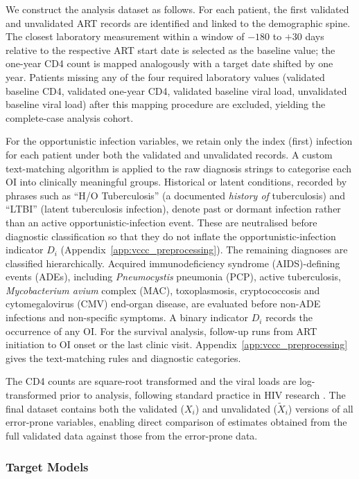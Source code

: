 We construct the analysis dataset as follows. For each patient, the first validated and unvalidated ART records are identified and linked to the demographic spine. The closest laboratory measurement within a window of $-180$ to $+30$ days relative to the respective ART start date is selected as the baseline value; the one-year CD4 count is mapped analogously with a target date shifted by one year. Patients missing any of the four required laboratory values (validated baseline CD4, validated one-year CD4, validated baseline viral load, unvalidated baseline viral load) after this mapping procedure are excluded, yielding the complete-case analysis cohort.

For the opportunistic infection variables, we retain only the index (first) infection for each patient under both the validated and unvalidated records. A custom text-matching algorithm is applied to the raw diagnosis strings to categorise each OI into clinically meaningful groups. Historical or latent conditions, recorded by phrases such as ``H/O Tuberculosis'' (a documented \emph{history of} tuberculosis) and ``LTBI'' (latent tuberculosis infection), denote past or dormant infection rather than an active opportunistic-infection event. These are neutralised before diagnostic classification so that they do not inflate the opportunistic-infection indicator $D_i$ (Appendix~\ref{app:vccc_preprocessing}). The remaining diagnoses are classified hierarchically. Acquired immunodeficiency syndrome (AIDS)-defining events (ADEs), including \textit{Pneumocystis} pneumonia (PCP), active tuberculosis, \textit{Mycobacterium avium} complex (MAC), toxoplasmosis, cryptococcosis and cytomegalovirus (CMV) end-organ disease, are evaluated before non-ADE infections and non-specific symptoms. A binary indicator $D_i$ records the occurrence of any OI. For the survival analysis, follow-up runs from ART initiation to OI onset or the last clinic visit. Appendix~\ref{app:vccc_preprocessing} gives the text-matching rules and diagnostic categories.

The CD4 counts are square-root transformed and the viral loads are log-transformed prior to analysis, following standard practice in HIV research \citep{amorim2021two}. The final dataset contains both the validated ($X_i$) and unvalidated ($\tilde{X}_i$) versions of all error-prone variables, enabling direct comparison of estimates obtained from the full validated data against those from the error-prone data.

\subsubsection{Target Models}

